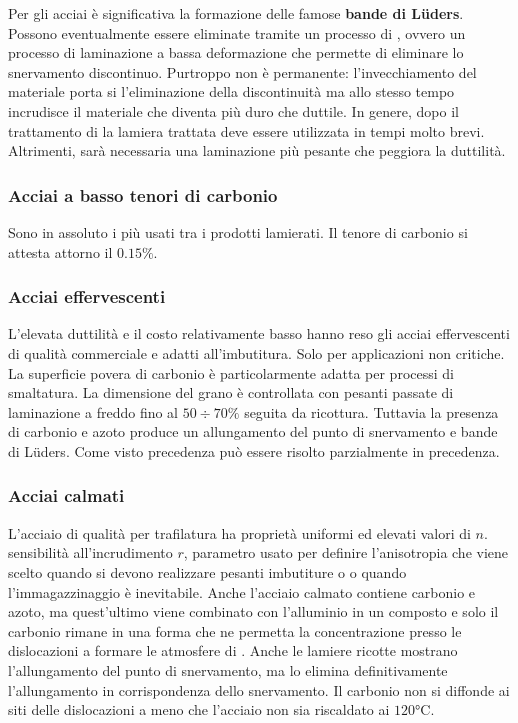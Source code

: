 Per gli acciai è significativa la formazione delle famose \textbf{bande di Lüders}.
Possono eventualmente essere eliminate tramite un processo di , ovvero un processo di laminazione a bassa deformazione che permette di eliminare lo snervamento discontinuo.
Purtroppo non è permanente: l'invecchiamento del materiale porta si l'eliminazione della discontinuità ma allo stesso tempo incrudisce il materiale che diventa più duro che duttile.
In genere, dopo il trattamento di  la lamiera trattata deve essere utilizzata in tempi molto brevi.
Altrimenti, sarà necessaria una laminazione più pesante che peggiora la duttilità.

\subsubsection{Acciai a basso tenori di carbonio}
Sono in assoluto i più usati tra i prodotti lamierati. Il tenore di carbonio si attesta attorno il $0.15\%$.

\subsubsection{Acciai effervescenti}
L'elevata duttilità e il costo relativamente basso hanno reso gli acciai effervescenti di qualità commerciale e adatti all'imbutitura.
Solo per applicazioni non critiche.
La superficie povera di carbonio è particolarmente adatta per processi di smaltatura.
La dimensione del grano è controllata con pesanti passate di laminazione a freddo fino al $50 \div 70 \%$ seguita da ricottura. 
Tuttavia la presenza di carbonio e azoto produce un allungamento del punto di snervamento e bande di Lüders. Come visto precedenza può essere risolto parzialmente in precedenza.

\subsubsection{Acciai calmati}
L'acciaio di qualità per trafilatura ha proprietà uniformi ed elevati valori di $n$. sensibilità all'incrudimento $r$, parametro usato per definire l'anisotropia che viene scelto quando si devono realizzare pesanti imbutiture o  o quando l'immagazzinaggio è inevitabile.
Anche l'acciaio calmato contiene carbonio e azoto, ma quest'ultimo viene combinato con l'alluminio in un composto e solo il carbonio rimane in una forma che ne permetta la concentrazione presso le dislocazioni a formare le atmosfere di .
Anche le lamiere ricotte mostrano l'allungamento del punto di snervamento, ma lo  elimina definitivamente l'allungamento in corrispondenza dello snervamento. Il carbonio non si diffonde ai siti delle dislocazioni a meno che l'acciaio non sia riscaldato ai $120\unit{\celsius}$.

